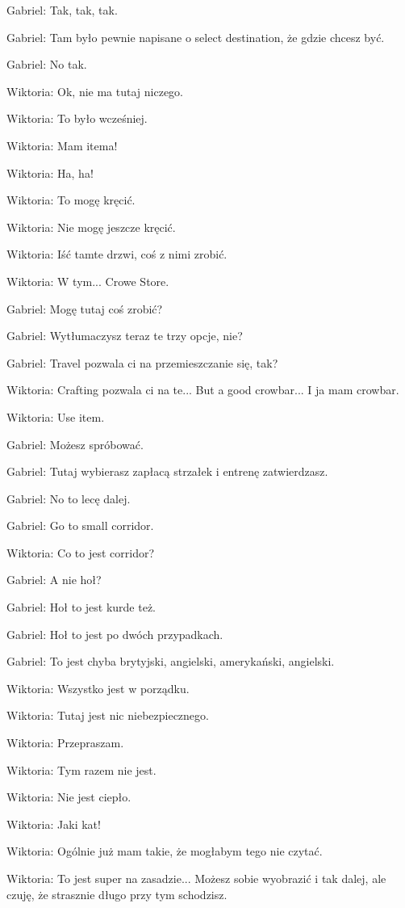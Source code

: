 Gabriel: Tak, tak, tak.

Gabriel: Tam było pewnie napisane o select destination, że gdzie chcesz być.

Gabriel: No tak.

Wiktoria: Ok, nie ma tutaj niczego.

Wiktoria: To było wcześniej.

Wiktoria: Mam itema!

Wiktoria: Ha, ha!

Wiktoria: To mogę kręcić.

Wiktoria: Nie mogę jeszcze kręcić.

Wiktoria: Iść tamte drzwi, coś z nimi zrobić.

Wiktoria: W tym... Crowe Store.

Gabriel: Mogę tutaj coś zrobić?

Gabriel: Wytłumaczysz teraz te trzy opcje, nie?

Gabriel: Travel pozwala ci na przemieszczanie się, tak?

Wiktoria: Crafting pozwala ci na te... But a good crowbar... I ja mam crowbar.

Wiktoria: Use item.

Gabriel: Możesz spróbować.

Gabriel: Tutaj wybierasz zapłacą strzałek i entrenę zatwierdzasz.

Gabriel: No to lecę dalej.

Gabriel: Go to small corridor.

Wiktoria: Co to jest corridor?

Gabriel: A nie hoł?

Gabriel: Hoł to jest kurde też.

Gabriel: Hoł to jest po dwóch przypadkach.

Gabriel: To jest chyba brytyjski, angielski, amerykański, angielski.

Wiktoria: Wszystko jest w porządku.

Wiktoria: Tutaj jest nic niebezpiecznego.

Wiktoria: Przepraszam.

Wiktoria: Tym razem nie jest.

Wiktoria: Nie jest ciepło.

Wiktoria: Jaki kat!

Wiktoria: Ogólnie już mam takie, że mogłabym tego nie czytać.

Wiktoria: To jest super na zasadzie... Możesz sobie wyobrazić i tak dalej, ale czuję, że strasznie długo przy tym schodzisz.

